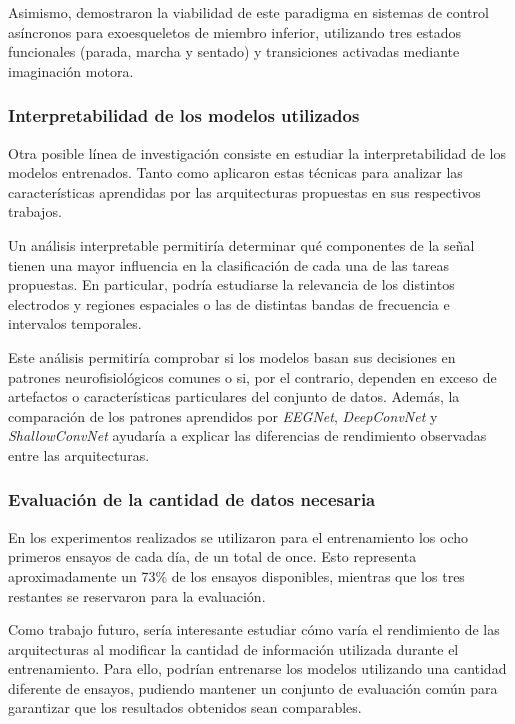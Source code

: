 Asimismo, \textcite{choi_DevelopingMotor2020} demostraron la viabilidad de este paradigma en sistemas de control asíncronos para exoesqueletos de miembro inferior, utilizando tres estados funcionales (parada, marcha y sentado) y transiciones activadas mediante imaginación motora.

\subsubsection{Interpretabilidad de los modelos utilizados}

Otra posible línea de investigación consiste en estudiar la interpretabilidad de los modelos entrenados. Tanto \textcite{lawhern_EEGNetCompact2018} como \textcite{schirrmeister_DeepLearning2017} aplicaron estas técnicas para analizar las características aprendidas por las arquitecturas propuestas en sus respectivos trabajos.

Un análisis interpretable permitiría determinar qué componentes de la señal tienen una mayor influencia en la clasificación de cada una de las tareas propuestas. En particular, podría estudiarse la relevancia de los distintos electrodos y regiones espaciales o las de distintas bandas de frecuencia e intervalos temporales.

Este análisis permitiría comprobar si los modelos basan sus decisiones en patrones neurofisiológicos comunes o si, por el contrario, dependen en exceso de artefactos o características particulares del conjunto de datos. Además, la comparación de los patrones aprendidos por \textit{EEGNet}, \textit{DeepConvNet} y \textit{ShallowConvNet} ayudaría a explicar las diferencias de rendimiento observadas entre las arquitecturas.

\subsubsection{Evaluación de la cantidad de datos necesaria}

En los experimentos realizados se utilizaron para el entrenamiento los ocho primeros ensayos de cada día, de un total de once. Esto representa aproximadamente un 73\% de los ensayos disponibles, mientras que los tres restantes se reservaron para la evaluación.

Como trabajo futuro, sería interesante estudiar cómo varía el rendimiento de las arquitecturas al modificar la cantidad de información utilizada durante el entrenamiento. Para ello, podrían entrenarse los modelos utilizando una cantidad diferente de ensayos, pudiendo mantener un conjunto de evaluación común para garantizar que los resultados obtenidos sean comparables.

